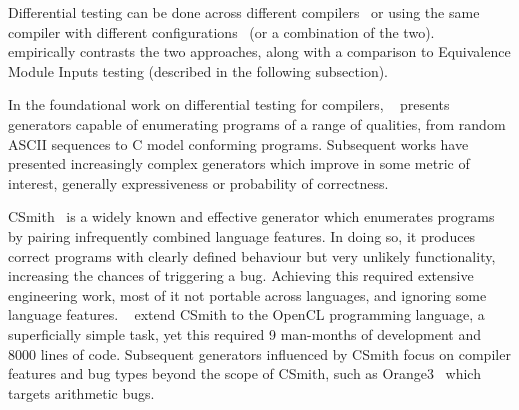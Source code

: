 Differential testing can be done across different compilers~\cite{Chen2016b,Lidbury2015a} or using the same compiler with different configurations~\cite{Kyle2015b,Paka2011} (or a combination of the two). \citeauthor{Chen2014a}~\cite{Chen2014a} empirically contrasts the two approaches, along with a comparison to Equivalence Module Inputs testing (described in the following subsection).

In the foundational work on differential testing for compilers, \citeauthor{McKeeman1998}~\cite{McKeeman1998} presents generators capable of enumerating programs of a range of qualities, from random ASCII sequences to C model conforming programs. Subsequent works have presented increasingly complex generators which improve in some metric of interest, generally expressiveness or probability of correctness.

CSmith~\cite{Yang2011} is a widely known and effective generator which enumerates programs by pairing infrequently combined language features. In doing so, it produces correct programs with clearly defined behaviour but very unlikely functionality, increasing the chances of triggering a bug. Achieving this required extensive engineering work, most of it not portable across languages, and ignoring some language features.
\citeauthor{Lidbury2015a}~\cite{Lidbury2015a} extend CSmith to the OpenCL programming language, a superficially simple task, yet this required 9 man-months of development and 8000 lines of code.
Subsequent generators influenced by CSmith focus on compiler features and bug types beyond the scope of CSmith, such as Orange3~\cite{Nagai2013} which targets arithmetic bugs.


